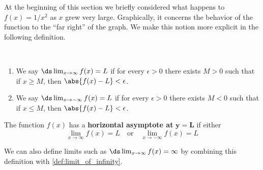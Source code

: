 At the beginning of this section we briefly considered what happens to $f(x) = 1/x^2$ as $x$ grew very large. 
Graphically, it concerns the behavior of the function to the ``far right'' of the graph. We make this notion more explicit in the following definition.

\begin{definition}\label{def:limit_at_infinity}
~\\[-2\baselineskip]\begin{enumerate}
\item We say $\ds\lim_{x\to\infty} f(x)=L$ if for every $\epsilon>0$ there exists $M>0$ such that if $x\geq M$, then $\abs{f(x)-L}<\epsilon$.

\item We say $\ds\lim_{x\to-\infty} f(x)=L$ if for every $\epsilon>0$ there exists $M<0$ such that if $x\leq M$, then $\abs{f(x)-L}<\epsilon$.

\end{enumerate}
\end{definition}

\begin{definition}\label{def:horiz_asymp}
The function $f(x)$ has a \textbf{horizontal asymptote at} $\mathbf{y=L}$ if either
\[\lim_{x\to \infty} f(x)=L \quad \text{or} \quad \lim_{x\to -\infty} f(x)=L\]
\end{definition}

We can also define limits such as $\ds\lim_{x\to\infty}f(x)=\infty$ by combining this definition with \autoref{def:limit_of_infinity}. %

